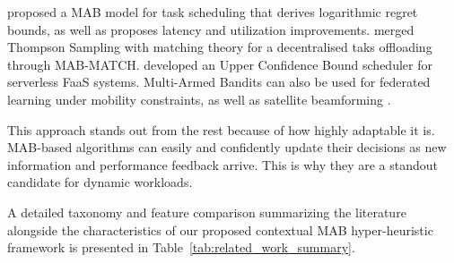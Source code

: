 \citet{Singh2024Leveraging} proposed a MAB model for task scheduling that derives logarithmic regret bounds, as well as proposes latency and utilization improvements. \citet{Tran-Dang2024Parallel} merged Thompson Sampling with matching theory for a decentralised taks offloading through MAB-MATCH. \citet{Chigu2024A} developed an Upper Confidence Bound scheduler for serverless FaaS systems. Multi-Armed Bandits can also be used for federated learning under mobility constraints, as well as satellite beamforming \citep{Jun2025Mobility,Liang2026Joint}.

This approach stands out from the rest because of how highly adaptable it is. MAB-based algorithms can easily and confidently update their decisions as new information and performance feedback arrive. This is why they are a standout candidate for dynamic workloads.

A detailed taxonomy and feature comparison summarizing the literature alongside the characteristics of our proposed contextual MAB hyper-heuristic framework is presented in Table~\ref{tab:related_work_summary}.


